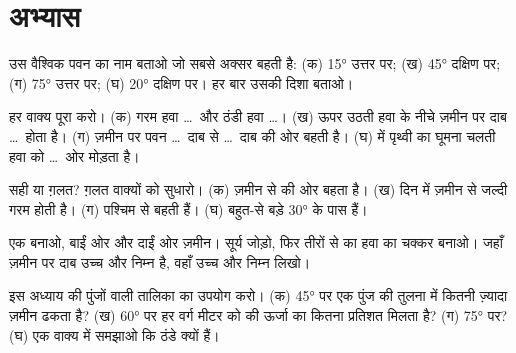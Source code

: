 \section{अभ्यास}

\begin{exercise}[$\star$]\label{exo:g8:winds-global-circulation:1}
उस वैश्विक पवन का नाम बताओ जो सबसे अक्सर बहती है: (क) \ang{15} उत्तर पर;
(ख) \ang{45} दक्षिण पर; (ग) \ang{75} उत्तर पर; (घ) \ang{20} दक्षिण पर।
हर बार उसकी दिशा बताओ।
\end{exercise}

\begin{exercise}[$\star$]\label{exo:g8:winds-global-circulation:2}
हर वाक्य पूरा करो। (क) गरम हवा \dots\ और ठंडी हवा \dots। (ख) ऊपर उठती हवा के
नीचे ज़मीन पर दाब \dots\ होता है। (ग) ज़मीन पर पवन \dots\ दाब से \dots\ दाब की ओर
बहती है। (घ)  में पृथ्वी का घूमना चलती हवा को \dots\ ओर मोड़ता
है।
\end{exercise}

\begin{exercise}[$\star$]\label{exo:g8:winds-global-circulation:3}
सही या ग़लत? ग़लत वाक्यों को सुधारो। (क)  ज़मीन से  की ओर बहता है।
(ख) दिन में ज़मीन  से जल्दी गरम होती है। (ग)  पश्चिम से बहती
हैं। (घ) बहुत-से बड़े  \ang{30}  के पास
हैं।
\end{exercise}

\begin{exercise}[$\star$]\label{exo:g8:winds-global-circulation:4}
एक  बनाओ, बाईं ओर  और दाईं ओर ज़मीन। सूर्य जोड़ो, फिर तीरों से 
का हवा का चक्कर बनाओ। जहाँ ज़मीन पर दाब उच्च और निम्न है, वहाँ उच्च और निम्न
लिखो।
\end{exercise}

\begin{exercise}[$\star\star$]\label{exo:g8:winds-global-circulation:5}
इस अध्याय की पुंजों वाली तालिका का उपयोग करो। (क) \ang{45} पर एक पुंज 
की तुलना में कितनी ज़्यादा ज़मीन ढकता है? (ख) \ang{60} पर हर वर्ग मीटर को  की ऊर्जा का कितना प्रतिशत मिलता है? (ग) \ang{75} पर? (घ) एक वाक्य में समझाओ
कि  ठंडे क्यों हैं।
\end{exercise}

